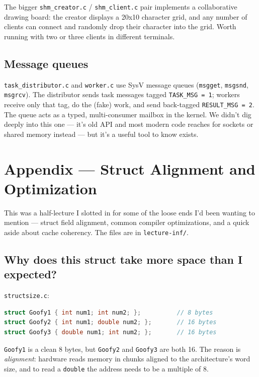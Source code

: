 \documentclass[11pt]{article}
\begin{document}
The bigger \texttt{shm\_creator.c} / \texttt{shm\_client.c} pair
implements a collaborative drawing board: the creator displays a
20x10 character grid, and any number of clients can connect and
randomly drop their character into the grid. Worth running with two
or three clients in different terminals.

\subsection*{Message queues}

\texttt{task\_distributor.c} and \texttt{worker.c} use SysV
message queues (\texttt{msgget}, \texttt{msgsnd}, \texttt{msgrcv}).
The distributor sends task messages tagged \texttt{TASK\_MSG = 1};
workers receive only that tag, do the (fake) work, and send
back-tagged \texttt{RESULT\_MSG = 2}. The queue acts as a typed,
multi-consumer mailbox in the kernel. We didn't dig deeply into
this one --- it's old API and most modern code reaches for sockets
or shared memory instead --- but it's a useful tool to know exists.

\section*{Appendix --- Struct Alignment and Optimization}

This was a half-lecture I slotted in for some of the loose ends I'd
been wanting to mention --- struct field alignment, common compiler
optimizations, and a quick aside about cache coherency. The files
are in \texttt{lecture-inf/}.

\subsection*{Why does this struct take more space than I expected?}

\texttt{structsize.c}:

\begin{lstlisting}[language=C]
struct Goofy1 { int num1; int num2; };          // 8 bytes
struct Goofy2 { int num1; double num2; };       // 16 bytes
struct Goofy3 { double num1; int num2; };       // 16 bytes
\end{lstlisting}

\texttt{Goofy1} is a clean 8 bytes, but \texttt{Goofy2} and
\texttt{Goofy3} are both 16. The reason is \emph{alignment}:
hardware reads memory in chunks aligned to the architecture's word
size, and to read a \texttt{double} the address needs to be a
multiple of 8.
\end{document}
